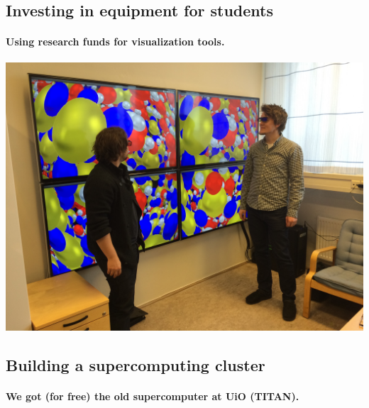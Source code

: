 \documentclass[%
oneside,                 %
final,                   %
10pt]{article}
\begin{document}
\noindent






\subsection*{Investing in equipment for students}

\paragraph{Using research funds for visualization tools.}


\centerline{\includegraphics[width=0.7\linewidth]{fig-future/visualize.jpg}}




\subsection*{Building a supercomputing cluster}

\paragraph{We got (for free) the old supercomputer at UiO (TITAN).}
\end{document}
